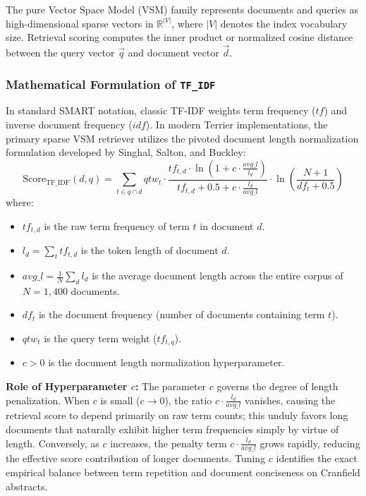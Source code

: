 \documentclass[10pt, a4paper]{article}
\begin{document}
The pure Vector Space Model (VSM) family represents documents and queries as high-dimensional sparse vectors in $\mathbb{R}^{|V|}$, where $|V|$ denotes the index vocabulary size. Retrieval scoring computes the inner product or normalized cosine distance between the query vector $\vec{q}$ and document vector $\vec{d}$.

\subsubsection{Mathematical Formulation of \texttt{TF\_IDF}}
In standard SMART notation, classic TF-IDF weights term frequency ($tf$) and inverse document frequency ($idf$). In modern Terrier implementations, the primary sparse VSM retriever utilizes the pivoted document length normalization formulation developed by Singhal, Salton, and Buckley:
\begin{equation}
\text{Score}_{\text{TF\_IDF}}(d, q) = \sum_{t \in q \cap d} qtw_t \cdot \frac{tf_{t,d} \cdot \ln\left(1 + c \cdot \frac{avg\_l}{l_d}\right)}{tf_{t,d} + 0.5 + c \cdot \frac{l_d}{avg\_l}} \cdot \ln\left(\frac{N + 1}{df_t + 0.5}\right)
\label{eq:vsm_tfidf}
\end{equation}
where:
\begin{itemize}[noitemsep,topsep=2pt]
    \item $tf_{t,d}$ is the raw term frequency of term $t$ in document $d$.
    \item $l_d = \sum_{t} tf_{t,d}$ is the token length of document $d$.
    \item $avg\_l = \frac{1}{N} \sum_{d} l_d$ is the average document length across the entire corpus of $N=1,400$ documents.
    \item $df_t$ is the document frequency (number of documents containing term $t$).
    \item $qtw_t$ is the query term weight ($tf_{t,q}$).
    \item $c > 0$ is the document length normalization hyperparameter.
\end{itemize}

\textbf{Role of Hyperparameter $c$:} The parameter $c$ governs the degree of length penalization. When $c$ is small ($c \to 0$), the ratio $c \cdot \frac{l_d}{avg\_l}$ vanishes, causing the retrieval score to depend primarily on raw term counts; this unduly favors long documents that naturally exhibit higher term frequencies simply by virtue of length. Conversely, as $c$ increases, the penalty term $c \cdot \frac{l_d}{avg\_l}$ grows rapidly, reducing the effective score contribution of longer documents. Tuning $c$ identifies the exact empirical balance between term repetition and document conciseness on Cranfield abstracts.
\end{document}
